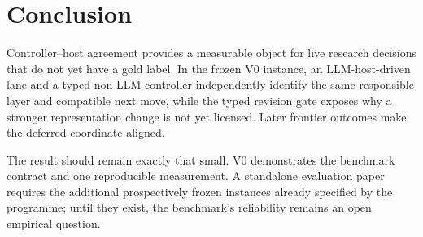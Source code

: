 \section{Conclusion}

Controller--host agreement provides a measurable object for live research decisions that do not yet have a gold label. In the frozen V0 instance, an LLM-host-driven lane and a typed non-LLM controller independently identify the same responsible layer and compatible next move, while the typed revision gate exposes why a stronger representation change is not yet licensed. Later frontier outcomes make the deferred coordinate aligned.

The result should remain exactly that small. V0 demonstrates the benchmark contract and one reproducible measurement. A standalone evaluation paper requires the additional prospectively frozen instances already specified by the programme; until they exist, the benchmark's reliability remains an open empirical question.